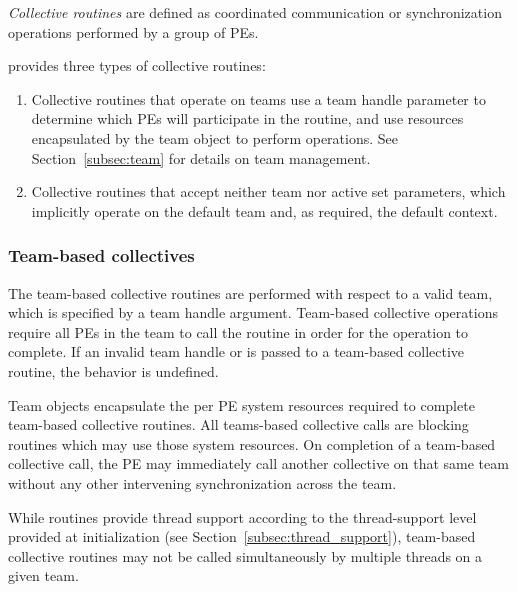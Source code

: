 \emph{Collective routines} are defined as coordinated communication or synchronization
operations performed by a group of \acp{PE}.

\openshmem provides three types of collective routines:

\begin{enumerate}
\item Collective routines that operate on teams use a team handle parameter to determine
  which \acp{PE} will participate in the routine, and use resources encapsulated by the team object
  to perform operations. See Section~\ref{subsec:team} for details on team management.


\item Collective routines that accept neither team nor active set
  parameters, which implicitly operate on the default team and, as
  required, the default context.
\end{enumerate}

\subsubsection*{Team-based collectives}

The team-based collective routines are performed with respect to a valid
\openshmem team, which is specified by a team handle argument.
Team-based collective operations require all \acp{PE} in the team to call
the routine in order for the operation to complete. If an invalid team handle
or  is passed to a team-based collective
routine, the behavior is undefined.

Team objects encapsulate the per \ac{PE} system resources required to complete
team-based collective routines.
All \openshmem teams-based collective calls are blocking routines which may use those
system resources. On completion of a team-based collective call, the \ac{PE} may
immediately call another collective on that same team without any other intervening
synchronization across the team.

While \openshmem routines provide thread support according to the
thread-support level provided at initialization (see
Section~\ref{subsec:thread_support}), team-based collective routines
may not be called simultaneously by multiple threads on a given team.

